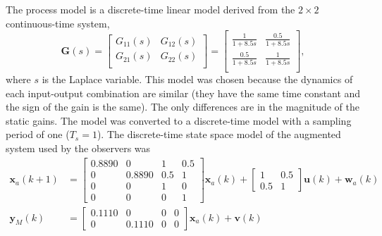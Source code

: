 The process model is a discrete-time linear model derived from the $2\times2$ continuous-time system,
\begin{equation} \label{eq:sim-sys-mimo-ct}
	\mathbf{G}(s) = \left[\begin{array}{cc}
		G_{11}(s) & G_{12}(s)  \\
		G_{21}(s) & G_{22}(s)  \\
	\end{array}\right] = \left[\begin{array}{cc}
		\frac{1}{1+8.5s} & \frac{0.5}{1+8.5s}  \\
		\frac{0.5}{1+8.5s} & \frac{1}{1+8.5s}  \\
	\end{array}\right],
\end{equation}
where $s$ is the Laplace variable.  This model was chosen because the dynamics of each input-output combination are similar (they have the same time constant and the sign of the gain is the same). The only differences are in the magnitude of the static gains. The model was converted to a discrete-time model with a sampling period of one ($T_s=1$). The discrete-time state space model of the augmented system used by the observers was
\begin{equation} \label{eq:sim-sys-2x2-ss-aug}
	\begin{split}
		\mathbf{x}_{a}(k+1) & =\left[\begin{array}{cccc}
			0.8890 & 0 & 1 & 0.5 \\
			0 & 0.8890 & 0.5 & 1 \\
			0 & 0 & 1 & 0 \\
			0 & 0 & 0 & 1
		\end{array}\right] \mathbf{x}_{a}(k) + \left[\begin{array}{cc}
			1 & 0.5 \\
			0.5 & 1
		\end{array}\right] \mathbf{u}(k) + \mathbf{w}_{a}(k) \\
		\mathbf{y}_M(k) & =\left[\begin{array}{cccc}
			0.1110 & 0 & 0 & 0 \\
			0 & 0.1110 & 0 & 0
		\end{array}\right] \mathbf{x}_{a}(k) + \mathbf{v}(k)
	\end{split}
\end{equation}
